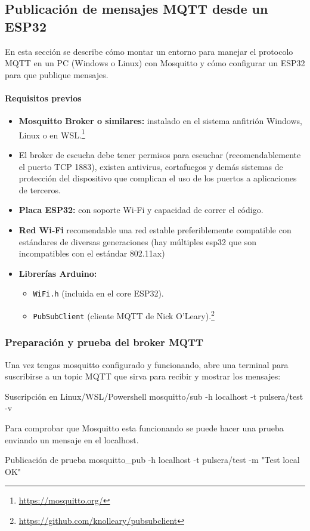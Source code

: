\documentclass[12pt, a4paper]{article}
\begin{document}
\begin{umaappendices}
	\subsection{Publicación de mensajes MQTT desde un ESP32}
		\label{sec:pub_mqtt_esp32}
		
		En esta sección se describe cómo montar un entorno para manejar el protocolo MQTT en un PC (Windows o Linux) con Mosquitto y cómo configurar un ESP32 para que publique mensajes.
		
		\paragraph{Requisitos previos}
		\begin{itemize}
			\item \textbf{Mosquitto Broker o similares:} instalado en el sistema anfitrión Windows, Linux o en WSL.\footnote{\url{https://mosquitto.org/}} 
			\item El broker de escucha debe tener permisos para escuchar (recomendablemente el puerto TCP 1883), existen antivirus, cortafuegos y demás sistemas de protección del dispositivo que complican el uso de los puertos a aplicaciones de terceros.
			\item \textbf{Placa ESP32:} con soporte Wi‑Fi y capacidad de correr el código.
			\item \textbf{Red Wi‑Fi} recomendable una red estable preferiblemente compatible con estándares de diversas generaciones (hay múltiples esp32 que son incompatibles con el estándar 802.11ax)
			\item \textbf{Librerías Arduino:}
			\begin{itemize}
				\item \texttt{WiFi.h} (incluida en el core ESP32).
				\item \texttt{PubSubClient} (cliente MQTT de Nick O’Leary).\footnote{\url{https://github.com/knolleary/pubsubclient}}
			\end{itemize}
		\end{itemize}
		
		\subsubsection{Preparación y prueba del broker MQTT}
		Una vez tengas mosquitto configurado y funcionando, abre una terminal para suscribirse a un topic MQTT que sirva para recibir y mostrar los mensajes:
		\begin{Terminal}{Suscripción en Linux/WSL/Powershell}
			mosquitto/sub -h localhost -t pulsera/test -v
		\end{Terminal}
		Para comprobar que Mosquitto esta funcionando se puede hacer una prueba enviando un mensaje en el localhost. 
		\begin{Terminal}{Publicación de prueba}
			mosquitto\_pub -h localhost -t pulsera/test -m "Test local OK"
		\end{Terminal}


\end{umaappendices}
\end{document}

